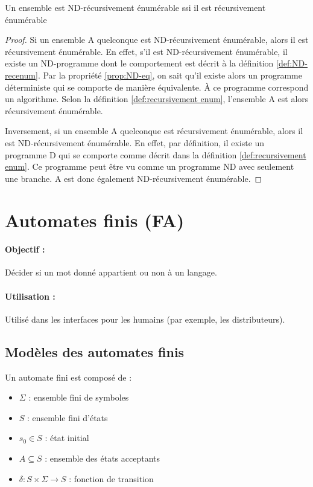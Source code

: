 \begin{myprop}
	Un ensemble est ND-récursivement énumérable ssi il est récursivement énumérable
	\begin{proof}
		Si un ensemble A quelconque est ND-récursivement énumérable, alors il est récursivement
		énumérable.
		En effet, s'il est ND-récursivement énumérable, il existe un ND-programme dont le comportement est décrit à la définition \ref{def:ND-recenum}.
		Par la propriété \ref{prop:ND-eq}, on sait qu'il existe alors un programme déterministe qui se comporte de manière équivalente. À ce programme correspond un algorithme.
		Selon la définition \ref{def:recursivement enum}, l'ensemble A est alors récursivement énumérable.

		Inversement, si un ensemble A quelconque est récursivement énumérable, alors il est ND-récursivement énumérable. En effet, par définition, il existe un programme D qui se comporte comme décrit dans la définition \ref{def:recursivement enum}.
		Ce programme peut être vu comme un programme ND avec seulement une branche. A est donc également ND-récursivement énumérable.
	\end{proof}

\end{myprop}

\section{Automates finis (FA)}
\label{sub:automates_finis}

\paragraph{Objectif :} Décider si un mot donné appartient ou non à un langage.

\paragraph{Utilisation :} Utilisé dans les interfaces pour les humains (par
exemple, les distributeurs).

\subsection{Modèles des automates finis}
\label{ssub:mod_les_des_automates_finis}
Un automate fini est composé de :

\begin{itemize}
	\item $\Sigma$ : ensemble fini de symboles
	\item $S$ : ensemble fini d'états
	\item $s_0 \in S$ : état initial
	\item $A \subseteq S$ : ensemble des états acceptants
	\item $\delta: S \times \Sigma \rightarrow S$ : fonction de transition
\end{itemize}

